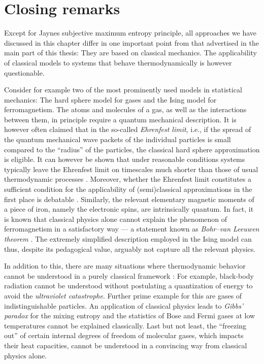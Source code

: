\documentclass[a4paper,12pt,listof=totoc,index=totoc,bibliography=totoc,headsepline=false,headings=normal,BCOR16.153846mm,DIV12,headinclude,twoside,cleardoublepage=empty,numbers=noenddot,final]{scrreprt}
\theoremstyle{mystyle}
\numberwithin{equation}{section}
\numberwithin{figure}{section}
\numberwithin{lemma}{section}
\numberwithin{theorem}{section}
\numberwithin{corollary}{section}
\numberwithin{definition}{section}
\numberwithin{conjecture}{section}
\numberwithin{observation}{section}
\newcommand{\+}{\mkern2mu}
\DeclareMathOperator{\1}{\mathds{1}}
\begin{document}
\section{Closing remarks}
\label{sec:somegeneralcriticalremarks}
%
Except for Jaynes subjective maximum entropy principle, all approaches we have discussed in this chapter differ in one important point from that advertised in the main part of this thesis:
They are based on classical mechanics.
The applicability of classical models to systems that behave thermodynamically is however questionable.

Consider for example two of the most prominently used models in statistical mechanics: 
The hard sphere model for gases and the Ising model for ferromagnetism.
The atoms and molecules of a gas, as well as the interactions between them, in principle require a quantum mechanical description.
It is however often claimed that in the so-called \emph{Ehrenfest limit}, i.e., if the spread of the quantum mechanical wave packets of the individual particles is small compared to the ``radius'' of the particles, the classical hard sphere approximation is eligible.
It can however be shown that under reasonable conditions systems typically leave the Ehrenfest limit on timescales much shorter than those of usual thermodynamic processes \cite[Chapter~4]{Gemmer09}.
Moreover, whether the Ehrenfest limit constitutes a sufficient condition for the applicability of (semi)classical approximations in the first place is debatable \cite{Ballentine1994}.
Similarly, the relevant elementary magnetic moments of a piece of iron, namely the electronic spins, are intrinsically quantum.
In fact, it is known that classical physics alone cannot explain the phenomenon of ferromagnetism in a satisfactory way --- a statement known as \emph{Bohr--van Leeuwen theorem} \cite{Bohr1911,Aharoni2000,Nolting2009}.
The extremely simplified description employed in the Ising model can thus, despite its pedagogical value, arguably not capture all the relevant physics.

In addition to this, there are many situations where thermodynamic behavior cannot be understood in a purely classical framework \cite{greiner}:
For example, black-body radiation cannot be understood without postulating a quantization of energy to avoid the \emph{ultraviolet catastrophe}.
Further prime example for this are gases of indistinguishable particles.
An application of classical physics leads to \emph{Gibbs' paradox} for the mixing entropy and the statistics of Bose and Fermi gases at low temperatures cannot be explained classically.
Last but not least, the ``freezing out'' of certain internal degrees of freedom of molecular gases, which impacts their heat capacities, cannot be understood in a convincing way from classical physics alone.
\end{document}
